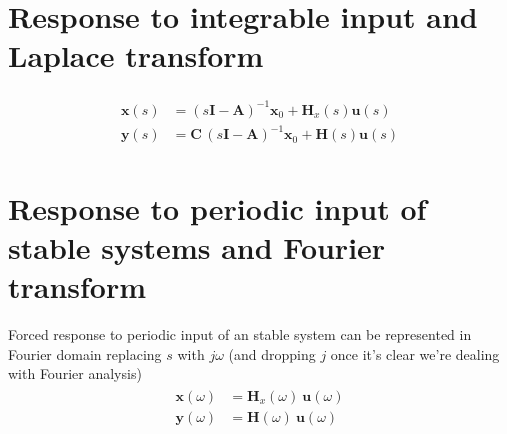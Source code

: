 \documentclass[letterpaper,10pt,english]{jupyterBook}
\begin{document}
\sphinxAtStartPar
{}  


\section{Response to integrable input \sphinxhyphen{} and Laplace transform}
\label{\detokenize{ch/system-theory/lti-response:response-to-integrable-input-and-laplace-transform}}\label{\detokenize{ch/system-theory/lti-response:ode-lti-response-laplace}}\begin{equation}\label{equation:ch/system-theory/lti-response:eq:lagrange:formula:laplace}
\begin{split}\begin{aligned}
  \mathbf{x}(s) & = \left(s \mathbf{I} - \mathbf{A} \right)^{-1} \mathbf{x}_0 + \mathbf{H}_x(s) \mathbf{u}(s) \\
  \mathbf{y}(s) & = \mathbf{C} \, \left( s \mathbf{I} - \mathbf{A} \right)^{-1} \mathbf{x}_0 + \mathbf{H}(s) \mathbf{u}(s)
\end{aligned}\end{split}
\end{equation}

\section{Response to periodic input of stable systems \sphinxhyphen{} and Fourier transform}
\label{\detokenize{ch/system-theory/lti-response:response-to-periodic-input-of-stable-systems-and-fourier-transform}}\label{\detokenize{ch/system-theory/lti-response:ode-lti-response-periodic}}
\sphinxAtStartPar
Forced response to periodic input of an stable system can be represented in Fourier domain replacing \(s\) with \(j \omega\) (and dropping \(j\) once it’s clear we’re dealing with Fourier analysis)
\begin{equation}\label{equation:ch/system-theory/lti-response:eq:lagrange:formula:fourier}
\begin{split}\begin{aligned}
  \mathbf{x}(\omega) & = \mathbf{H}_x(\omega) \ \mathbf{u}(\omega) \\
  \mathbf{y}(\omega) & = \mathbf{H}  (\omega) \ \mathbf{u}(\omega)
\end{aligned}\end{split}
\end{equation}
\end{document}
